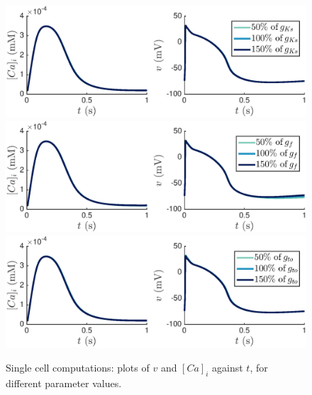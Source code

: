\documentclass[12pt,a4paper]{article}
\begin{document}
%
\begin{figure}
   \includegraphics[trim=0cm 0cm 0cm 0cm, clip=true, width=1\linewidth]{sc_gks} 
   \includegraphics[trim=0cm 0cm 0cm 0cm, clip=true, width=1\linewidth]{sc_gf} 
      \includegraphics[trim=0cm 0cm 0cm 0cm, clip=true, width=1\linewidth]{sc_gto} 
    \caption{Single cell computations: plots of $v$ and $[Ca]_i$ against $t$, for different parameter values.}
    \label{fig:5a}
\end{figure}
%
\end{document}
